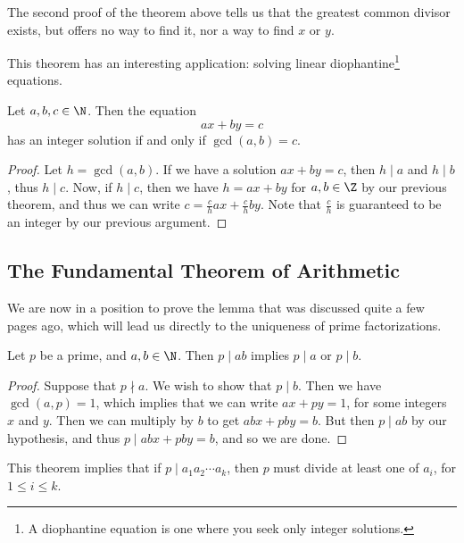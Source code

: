\documentclass[a4paper]{scrreprt}
\begin{document}
\begin{remark}
	The second proof of the theorem above tells us that the greatest common divisor exists, but offers no way to find it, nor a way to find $x$ or $y$. 
\end{remark}

This theorem has an interesting application: solving linear diophantine\footnote{A diophantine equation is one where you seek only integer solutions.} equations. 

\begin{corollary}
	Let $a, b, c \in \N$. Then the equation
	$$
	ax + by = c
	$$
	has an integer solution if and only if $\gcd(a, b) = c$.
\end{corollary}
\begin{proof}
	Let $h = \gcd(a, b)$. If we have a solution $ax + by = c$, then $h \mid a$ and $h \mid b$, thus $h \mid c$. Now, if $h \mid c$, then we have $h = ax + by$ for $a, b \in \Z$ by our previous theorem, and thus we can write $c = \frac{c}{h}ax + \frac{c}{h}by$. Note that $\frac{c}{h}$ is guaranteed to be an integer by our previous argument.
\end{proof}

\subsection{The Fundamental Theorem of Arithmetic}

We are now in a position to prove the lemma that was discussed quite a few pages ago, which will lead us directly to the uniqueness of prime factorizations.

\begin{theorem}
	Let $p$ be a prime, and $a, b \in \N$. Then $p \mid ab$ implies $p \mid a$ or $p \mid b$.
\end{theorem}
\begin{proof}
	Suppose that $p \nmid a$. We wish to show that $p \mid b$. Then we have $\gcd(a, p) = 1$, which implies that we can write $ax + py = 1$, for some integers $x$ and $y$. Then we can multiply by $b$ to get $abx + pby = b$. But then $p \mid ab$ by our hypothesis, and thus $p \mid abx + pby = b$, and so we are done.
\end{proof}

\begin{remark}
	This theorem implies that if $p \mid a_1 a_2 \cdots a_k$, then $p$ must divide at least one of $a_i$, for $1 \leq i \leq k$.
\end{remark}
\end{document}
